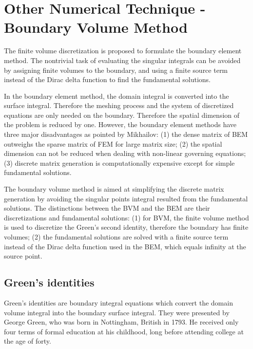 \chapter{Other Numerical Technique - Boundary Volume Method}

The finite volume discretization is proposed to formulate the boundary element method. The nontrivial task of evaluating the singular integrals can be avoided by assigning finite volumes to the boundary, and using a finite source term instead of the Dirac delta function to find the fundamental solutions.

In the boundary element method, the domain integral is converted into the surface integral. Therefore the meshing process and the system of discretized equations are only needed on the boundary. Therefore the spatial dimension of the problem is reduced by one. However, the boundary element methods have three major disadvantages as pointed by Mikhailov\cite{Mikhailov05, Mikhailov02}: (1) the dense matrix of BEM outweighs the sparse matrix of FEM for large matrix size; (2) the spatial dimension can not be reduced when dealing with non-linear governing equations; (3) discrete matrix generation is computationally expensive except for simple fundamental solutions.

The boundary volume method is aimed at simplifying the discrete matrix generation by avoiding the singular points integral resulted from the fundamental solutions. The distinctions between the BVM and the BEM are their discretizations and fundamental solutions: (1) for BVM, the finite volume method is used to discretize the Green's second identity, therefore the boundary has finite volumes; (2) the fundamental solutions are solved with a finite source term instead of the Dirac delta function used in the BEM, which equals infinity at the source point.


\section{Green's identities}

Green's identities are boundary integral equations which convert the domain volume integral into the boundary surface integral. They were presented by George Green, who was born in Nottingham, British in 1793. He received only four terms of formal education at his childhood, long before attending college at the age of forty\citep{Cannell01}.


